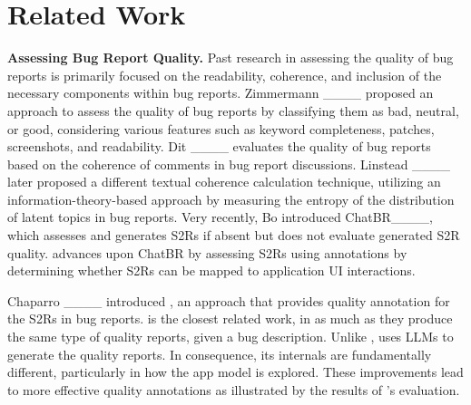 \section{Related Work}
\label{sec:related_work}


\textbf{Assessing Bug Report Quality.} 
Past research in assessing the quality of bug reports is primarily focused on the readability, coherence, and inclusion of the necessary components within bug reports. Zimmermann ____ proposed an approach to assess the quality of bug reports by classifying them as bad, neutral, or good, considering various features such as keyword completeness, patches, screenshots, and readability.
Dit  \etal____ evaluates the quality of bug reports based on the coherence of comments in bug report discussions.  
Linstead  \etal ____ later proposed a different textual coherence calculation technique, utilizing an information-theory-based approach by measuring the entropy of the distribution of latent topics in bug reports. 
Very recently, Bo  \etal introduced ChatBR____, which assesses and generates S2Rs if absent but does not evaluate generated S2R quality. \tool advances upon ChatBR by assessing S2Rs using annotations by determining whether S2Rs can be mapped to application UI interactions.

Chaparro  \etal ____ introduced \EulerC, an approach that provides quality annotation for the S2Rs in bug reports.
\EulerC is the closest related work, in as much as they produce the same type of quality reports, given a bug description.
Unlike \EulerC, \tool uses LLMs to generate the quality reports. In consequence, its internals are fundamentally different, particularly in how the app model is explored. These improvements lead to more effective quality annotations as illustrated by the results of \tool's evaluation.  

